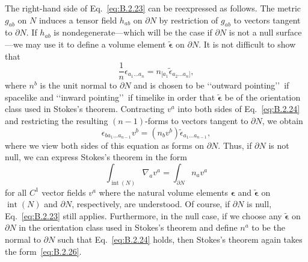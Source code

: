 The right-hand side of Eq.~\eqref{eq:B.2.23} can be reexpressed as follows. The
metric \(g_{ab}\) on \(N\) induces a tensor field \(h_{ab}\) on \(\partial N\) by
restriction of \(g_{ab}\) to vectors tangent to \(\partial N\). If \(h_{ab}\) is
nondegenerate---which will be the case if \(\partial N\) is not a null
surface---we may use it to define a volume element
\(\widetilde{\boldsymbol\epsilon}\) on \(\partial N\). It is not difficult to show
that
\begin{equation}
  \frac1n\epsilon_{a_1\ldots a_n}
  =n_{[a_1}\widetilde\epsilon_{a_2\ldots a_n]},
  \tag{B.2.24}\label{eq:B.2.24}
\end{equation}
where \(n^b\) is the unit normal to \(\partial N\) and is chosen to be
\lq\lq outward pointing\rq\rq\ if spacelike and \lq\lq inward pointing\rq\rq\ if
timelike in order that \(\widetilde{\boldsymbol\epsilon}\) be of the orientation class
used in Stokes's theorem. Contracting \(v^a\) into both sides of
Eq.~\eqref{eq:B.2.24} and restricting the resulting \((n-1)\)-forms to vectors
tangent to \(\partial N\), we obtain
\begin{equation}
  \epsilon_{ba_1\ldots a_{n-1}}v^b
  =(n_bv^b)\widetilde\epsilon_{a_1\ldots a_{n-1}},
  \tag{B.2.25}\label{eq:B.2.25}
\end{equation}
where we view both sides of this equation as forms on \(\partial N\). Thus, if
\(\partial N\) is not null, we can express Stokes's theorem in the form
\begin{equation}
  \int_{\operatorname{int}(N)}\nabla_av^a
  =\int_{\partial N}n_av^a
  \tag{B.2.26}\label{eq:B.2.26}
\end{equation}
for all \(C^1\) vector fields \(v^a\) where the natural volume elements
\(\boldsymbol\epsilon\) and \(\widetilde{\boldsymbol\epsilon}\) on
\(\operatorname{int}(N)\) and \(\partial N\), respectively, are understood. Of
course, if \(\partial N\) is null, Eq.~\eqref{eq:B.2.23} still applies. Furthermore,
in the null case, if we choose any \(\widetilde{\boldsymbol\epsilon}\) on
\(\partial N\) in the orientation class used in Stokes's theorem and define \(n^a\)
to be the normal to \(\partial N\) such that Eq.~\eqref{eq:B.2.24} holds, then
Stokes's theorem again takes the form~\eqref{eq:B.2.26}.

